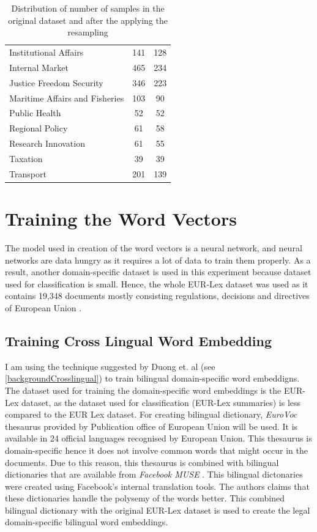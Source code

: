 \begin{table}[!ht]
\begin{tabular}{lcc}
Institutional Affairs & 141 & 128 \\
Internal Market & 465 & 234 \\
Justice Freedom Security & 346 & 223 \\
Maritime Affairs and Fisheries & 103 & 90 \\
Public Health & 52 & 52 \\
Regional Policy & 61 & 58 \\
Research Innovation & 61 & 55 \\
Taxation & 39 & 39 \\
Transport & 201 & 139 \\ \cline{1-3}
\end{tabular}
\caption{Distribution of number of samples in the original dataset and after the applying the resampling}
\label{table:befforeAfterResampling}
\end{table}
\section{Training the Word Vectors}

The model used in creation of the word vectors is a neural network, and neural networks are data hungry as it requires a lot of data to train them properly. As a result, another domain-specific dataset is used in this experiment because dataset used for classification is small. Hence, the whole EUR-Lex dataset was used as it contains 19,348 documents mostly consisting regulations, decisions and directives of European Union \cite{jf:SemanticLaw}.

\subsection{Training Cross Lingual Word Embedding}\label{implementationCrossLingual}

I am using the technique suggested by Duong et. al \cite{duong-EtAl:2016:EMNLP} (see \ref{backgroundCrosslingual}) to train bilingual domain-specific word embeddigns.
The dataset used for training the domain-specific word embeddings is the EUR-Lex dataset, as the dataset used for classification (EUR-Lex summaries) is less compared to the EUR Lex dataset. For creating bilingual dictionary, \textit{EuroVoc} thesaurus \cite{steinberger2002cross} provided by Publication office of European Union will be used. It is available in 24 official languages recognised by European Union. This thesaurus is domain-specific hence it does not involve common words that might occur in the documents. Due to this reason, this thesaurus is combined with bilingual dictionaries that are available from \textit{Facebook MUSE} \cite{conneau2017word}. This bilingual dictonaries were created using Facebook's internal translation tools. The authors claims that these dictionaries handle the polysemy of the words better. This combined bilingual dictionary with the original EUR-Lex dataset is used to create the legal domain-specific bilingual word embeddings. 

